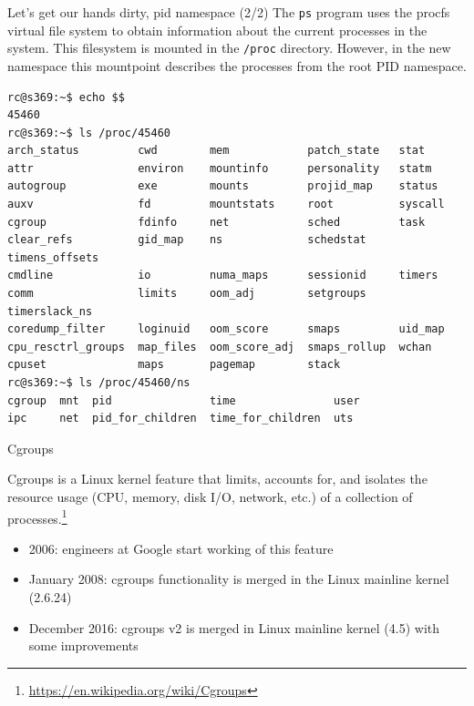 \documentclass[
  english,          
  aspectratio=169,    %
]{tumbeamer}
\begin{document}
\begin{frame}[fragile]{Let's get our hands dirty, pid namespace (2/2)}
\footnotesize The \texttt{ps} program uses the procfs virtual file system to obtain information about the current processes in the system. This filesystem is mounted in the \texttt{/proc} directory. However, in the new namespace this mountpoint describes the processes from the root PID namespace.
\begin{verbatim}
rc@s369:~$ echo $$
45460
rc@s369:~$ ls /proc/45460
arch_status         cwd        mem            patch_state   stat
attr                environ    mountinfo      personality   statm
autogroup           exe        mounts         projid_map    status
auxv                fd         mountstats     root          syscall
cgroup              fdinfo     net            sched         task
clear_refs          gid_map    ns             schedstat     timens_offsets
cmdline             io         numa_maps      sessionid     timers
comm                limits     oom_adj        setgroups     timerslack_ns
coredump_filter     loginuid   oom_score      smaps         uid_map
cpu_resctrl_groups  map_files  oom_score_adj  smaps_rollup  wchan
cpuset              maps       pagemap        stack
rc@s369:~$ ls /proc/45460/ns
cgroup  mnt  pid               time               user
ipc     net  pid_for_children  time_for_children  uts
\end{verbatim}
\end{frame}

\begin{frame}{Cgroups}

Cgroups is a Linux kernel feature that limits, accounts for, and isolates the resource usage (CPU, memory, disk I/O, network, etc.) of a collection of processes.\footnote{\href{https://en.wikipedia.org/wiki/Cgroups}{https://en.wikipedia.org/wiki/Cgroups}}
\vspace{10mm}
\begin{itemize}
    \item 2006: engineers at Google start working of this feature
    \item January 2008: cgroups functionality is merged in the Linux mainline kernel (2.6.24)
    \item December 2016: cgroups v2 is merged in Linux mainline kernel (4.5) with some improvements
\end{itemize}
\end{frame}
\end{document}
